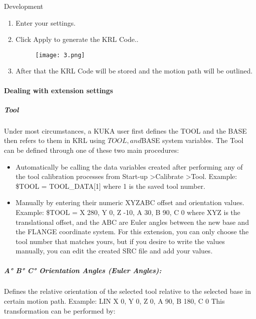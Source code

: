 \documentclass[a4paper]{book}
\begin{document}
\begin{chapter}{Development}
\begin{enumerate}
	\item Enter your settings.
	\item Click Apply to generate the KRL Code..
		\begin{figure}[H]
	\centering
		\texttt{[image: 3.png]}
		\end{figure}
   \item After that the KRL Code will be stored and the motion path will be outlined.
   
\end{enumerate}

\paragraph{Dealing with extension settings}
\subparagraph{Tool}
Under most circumstances, a KUKA user first defines the TOOL and the BASE then refers to them in KRL using $TOOL, and $BASE system variables. The Tool can be defined through one of these two main procedures:
\begin{itemize}
	\item 	Automatically be calling the data variables created after performing any of the tool calibration processes from Start-up \textgreater Calibrate \textgreater Tool. Example: \$TOOL = TOOL\_DATA[1] where 1 is the saved tool number.
	\item Manually by entering their numeric XYZABC offset and orientation values. Example: \$TOOL = {X 280, Y 0, Z -10, A 30, B 90, C 0} where XYZ is the translational offset, and the ABC are Euler angles between the new base and the FLANGE coordinate system.
	For this extension, you can only choose the tool number that matches yours, but if you desire to write the values manually, you can edit the created SRC file and add your values.
\end{itemize}
\subparagraph{A° B° C° Orientation Angles (Euler Angles):}
Defines the relative orientation of the selected tool relative to the selected base in certain motion path. Example: LIN {X 0, Y 0, Z 0, A 90, B 180, C 0}
This transformation can be performed by:


\end{chapter}
\end{document}
